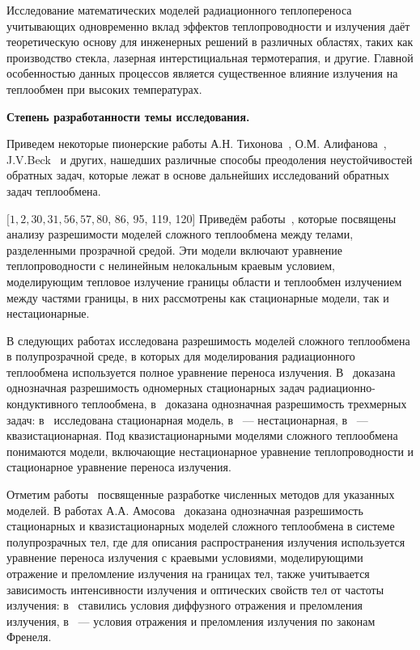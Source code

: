 Исследование математических моделей радиационного теплопереноса учитывающих одновременно
вклад эффектов теплопроводности и излучения даёт теоретическую основу для инженерных
решений в различных областях,
таких как производство стекла,
лазерная интерстициальная термотерапия, и другие.
Главной особенностью данных процессов является существенное влияние излучения
на теплообмен при высоких температурах.




\textbf{Степень разработанности темы исследования.}

Приведем некоторые пионерские работы А.Н. Тихонова~\cite{TikhonovSamarskii1972},
О.М. Алифанова~\cite{Aliphanov2009}, J.V.Beck~\cite[]{Beck1985-fg}
и других, нашедших различные способы преодоления неустойчивостей обратных задач,
которые лежат в основе дальнейших исследований обратных задач теплообмена.

$[1,2,30,31,56,57,80$, 86, 95, 119, 120]
Приведём работы~\cite{Tiihonen1997a, Tiihonen1997b,
metzger1999existence,
    Amosov2005, Amosov2009, Philip2010, Amosov2016, Amosov2017,
    amosov2010stationary, amosov2010stationary, druet2009weak, druet2010weak,
laitinen2001conductive,
}, которые посвящены
анализу разрешимости моделей сложного
теплообмена между телами, разделенными прозрачной средой.
Эти модели включают уравнение теплопроводности с нелинейным нелокальным краевым условием,
моделирующим тепловое излучение границы области и теплообмен излучением между частями границы,
в них рассмотрены как стационарные модели, так и нестационарные.

В следующих работах исследована разрешимость моделей сложного теплообмена в полупрозрачной среде,
в которых для моделирования радиационного теплообмена используется полное уравнение переноса излучения.
В~\cite{asllanaj2003existence, kelley1996existence} доказана однозначная разрешимость
одномерных стационарных задач радиационно-кондуктивного
теплообмена, в~\cite{ghattassi2018existence, Porzio2004, Thompson2004} доказана
однозначная разрешимость трехмерных задач: в~\cite{Thompson2004}
исследована стационарная модель, в~\cite{Porzio2004} — нестационарная,
в~\cite{ghattassi2018existence} — квазистационарная.
Под квазистационарными моделями сложного теплообмена понимаются модели,
включающие нестационарное
уравнение теплопроводности и стационарное уравнение переноса излучения.

Отметим работы~\cite{asllanaj2004convergence, asllanaj2007transient, banoczi1999fast,
ghattassi2016galerkin, klein2005transient, kovtanyuk2012
} посвященные разработке численных методов для указанных моделей.
В работах А.А. Амосова~\cite{Amosov2016, Amosov2017, amosov2016unique, amosov2017unique}
доказана однозначная
разрешимость стационарных и квазистационарных
моделей сложного теплообмена в системе полупрозрачных тел, где для
описания распространения излучения используется
уравнение переноса излучения с краевыми условиями, моделирующими отражение и преломление излучения
на границах тел, также учитывается зависимость интенсивности излучения и оптических
свойств тел от частоты
излучения: в~\cite{Amosov2016, Amosov2017} ставились
условия диффузного отражения и преломления излучения,
в~\cite{amosov2016unique, amosov2017unique}  — условия отражения
и преломления излучения по законам Френеля.


